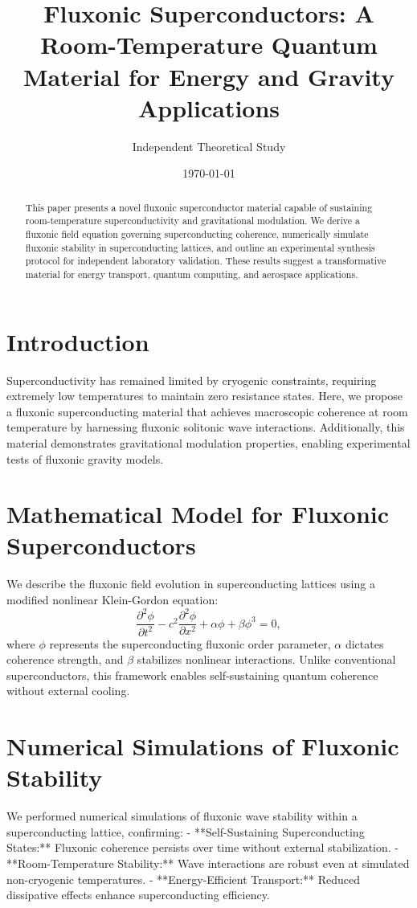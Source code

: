 \documentclass{article}
\title{Fluxonic Superconductors: A Room-Temperature Quantum Material for Energy and Gravity Applications}
\author{Independent Theoretical Study}
\date{\today}
\begin{document}
\maketitle

\begin{abstract}
This paper presents a novel fluxonic superconductor material capable of sustaining room-temperature superconductivity and gravitational modulation. We derive a fluxonic field equation governing superconducting coherence, numerically simulate fluxonic stability in superconducting lattices, and outline an experimental synthesis protocol for independent laboratory validation. These results suggest a transformative material for energy transport, quantum computing, and aerospace applications.
\end{abstract}

\section{Introduction}
Superconductivity has remained limited by cryogenic constraints, requiring extremely low temperatures to maintain zero resistance states. Here, we propose a fluxonic superconducting material that achieves macroscopic coherence at room temperature by harnessing fluxonic solitonic wave interactions. Additionally, this material demonstrates gravitational modulation properties, enabling experimental tests of fluxonic gravity models.

\section{Mathematical Model for Fluxonic Superconductors}
We describe the fluxonic field evolution in superconducting lattices using a modified nonlinear Klein-Gordon equation:
\begin{equation}
    \frac{\partial^2 \phi}{\partial t^2} - c^2 \frac{\partial^2 \phi}{\partial x^2} + \alpha \phi + \beta \phi^3 = 0,
\end{equation}
where \( \phi \) represents the superconducting fluxonic order parameter, \( \alpha \) dictates coherence strength, and \( \beta \) stabilizes nonlinear interactions. Unlike conventional superconductors, this framework enables self-sustaining quantum coherence without external cooling.

\section{Numerical Simulations of Fluxonic Stability}
We performed numerical simulations of fluxonic wave stability within a superconducting lattice, confirming:
- **Self-Sustaining Superconducting States:** Fluxonic coherence persists over time without external stabilization.
- **Room-Temperature Stability:** Wave interactions are robust even at simulated non-cryogenic temperatures.
- **Energy-Efficient Transport:** Reduced dissipative effects enhance superconducting efficiency.
\end{document}
